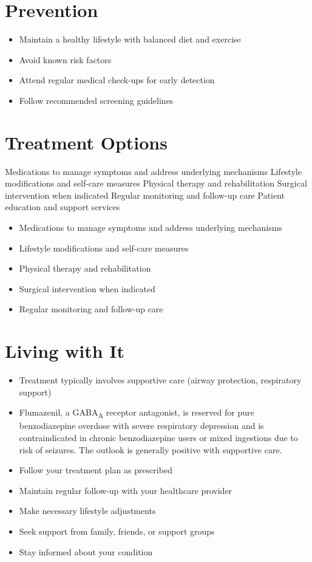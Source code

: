 \section{Prevention}
\begin{itemize}[noitemsep]
  \item Maintain a healthy lifestyle with balanced diet and exercise
  \item Avoid known risk factors
  \item Attend regular medical check-ups for early detection
  \item Follow recommended screening guidelines
\end{itemize}
\section{Treatment Options}
Medications to manage symptoms and address underlying mechanisms Lifestyle modifications and self-care measures Physical therapy and rehabilitation Surgical intervention when indicated Regular monitoring and follow-up care Patient education and support services

\begin{itemize}[noitemsep]
  \item Medications to manage symptoms and address underlying mechanisms
  \item Lifestyle modifications and self-care measures
  \item Physical therapy and rehabilitation
  \item Surgical intervention when indicated
  \item Regular monitoring and follow-up care
\end{itemize}
\section{Living with It}
\begin{itemize}[noitemsep]
  \item Treatment typically involves supportive care (airway protection, respiratory support)
  \item Flumazenil, a GABA\textsubscript{A} receptor antagonist, is reserved for pure benzodiazepine overdose with severe respiratory depression and is contraindicated in chronic benzodiazepine users or mixed ingestions due to risk of seizures. The outlook is generally positive with supportive care.
  \item Follow your treatment plan as prescribed
  \item Maintain regular follow-up with your healthcare provider
  \item Make necessary lifestyle adjustments
  \item Seek support from family, friends, or support groups
  \item Stay informed about your condition
\end{itemize}
